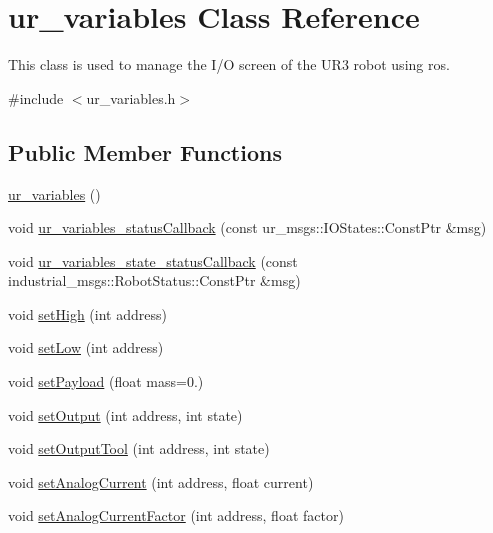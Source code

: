 \hypertarget{classur__variables}{}\section{ur\+\_\+variables Class Reference}
\label{classur__variables}


This class is used to manage the I/O screen of the U\+R3 robot using ros.  




{\ttfamily \#include $<$ur\+\_\+variables.\+h$>$}

\subsection*{Public Member Functions}
\begin{DoxyCompactItemize}
\item 
\hyperlink{classur__variables_ae48f4c06e283ae8652ebf1d58ce7aa57}{ur\+\_\+variables} ()
\item 
void \hyperlink{classur__variables_a2eb944230192b5fbbcce71e27d533bae}{ur\+\_\+variables\+\_\+status\+Callback} (const ur\+\_\+msgs\+::\+I\+O\+States\+::\+Const\+Ptr \&msg)
\item 
void \hyperlink{classur__variables_a3da1e6c56506adc53c6dc1177ad5f919}{ur\+\_\+variables\+\_\+state\+\_\+status\+Callback} (const industrial\+\_\+msgs\+::\+Robot\+Status\+::\+Const\+Ptr \&msg)
\item 
void \hyperlink{classur__variables_a890d76f17080f795019952ea36e99de9}{set\+High} (int address)
\item 
void \hyperlink{classur__variables_adaa62059d6889e0050d7e784755e1054}{set\+Low} (int address)
\item 
void \hyperlink{classur__variables_ad2d4c4965eac5b61465b1fc3ee8667c6}{set\+Payload} (float mass=0.)
\item 
void \hyperlink{classur__variables_a2372f1f4492b3272d3908ddd8e535dab}{set\+Output} (int address, int state)
\item 
void \hyperlink{classur__variables_a4109fb52d270fd0d180eeadda8e47c18}{set\+Output\+Tool} (int address, int state)
\item 
void \hyperlink{classur__variables_a3e19da4c1997732e1ec1bb8cbd632126}{set\+Analog\+Current} (int address, float current)
\item 
void \hyperlink{classur__variables_a8801071f124c7aa54ae2a6cde66fc00c}{set\+Analog\+Current\+Factor} (int address, float factor)
\item 

\end{DoxyCompactItemize}

